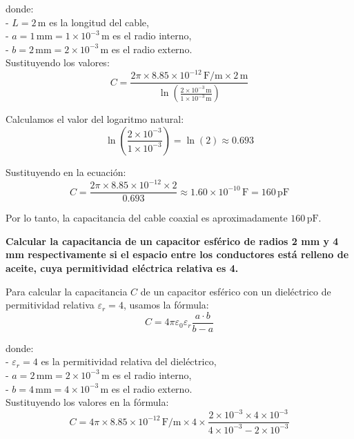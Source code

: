 \documentclass[answers]{exam} %
\begin{document}
\begin{questions}
        donde:\\
        
        - \( L = 2 \, \text{m} \) es la longitud del cable,\\
        - \( a = 1 \, \text{mm} = 1 \times 10^{-3} \, \text{m} \) es el radio interno,\\
        - \( b = 2 \, \text{mm} = 2 \times 10^{-3} \, \text{m} \) es el radio externo.\\
        
        Sustituyendo los valores:
        \[
        C = \frac{2 \pi \times 8.85 \times 10^{-12} \, \text{F/m} \times 2 \, \text{m}}{\ln\left(\frac{2 \times 10^{-3} \, \text{m}}{1 \times 10^{-3} \, \text{m}}\right)}
        \]
        
        Calculamos el valor del logaritmo natural:
        \[
        \ln\left(\frac{2 \times 10^{-3}}{1 \times 10^{-3}}\right) = \ln(2) \approx 0.693
        \]
        
        Sustituyendo en la ecuación:
        \[
        C = \frac{2 \pi \times 8.85 \times 10^{-12} \times 2}{0.693} \approx 1.60 \times 10^{-10} \, \text{F} = 160 \, \text{pF}
        \]
        
        Por lo tanto, la capacitancia del cable coaxial es aproximadamente \( 160 \, \text{pF} \).
        
     \vspace{0.5cm}
    \question \large\textbf{Calcular la capacitancia de un capacitor esférico de radios 2 mm y 4 mm
    respectivamente si el espacio entre los conductores está relleno de aceite, cuya
    permitividad eléctrica relativa es 4.}

    
        Para calcular la capacitancia \( C \) de un capacitor esférico con un dieléctrico de permitividad relativa \( \varepsilon_r = 4 \), usamos la fórmula:
        \[
        C = 4 \pi \varepsilon_0 \varepsilon_r \frac{a \cdot b}{b - a}
        \]

        donde:\\
        - \( \varepsilon_r = 4 \) es la permitividad relativa del dieléctrico,\\
        - \( a = 2 \, \text{mm} = 2 \times 10^{-3} \, \text{m} \) es el radio interno,\\
        - \( b = 4 \, \text{mm} = 4 \times 10^{-3} \, \text{m} \) es el radio externo.\\
        
        Sustituyendo los valores en la fórmula:
        \[
        C = 4 \pi \times 8.85 \times 10^{-12} \, \text{F/m} \times 4 \times \frac{2 \times 10^{-3} \times 4 \times 10^{-3}}{4 \times 10^{-3} - 2 \times 10^{-3}}
        \]
        

\end{questions}
\end{document}
